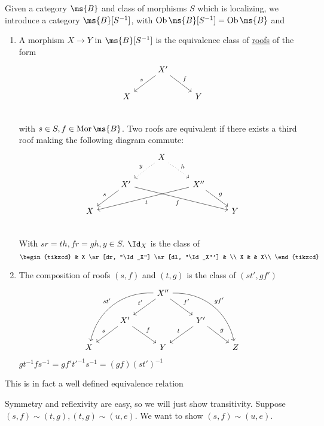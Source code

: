 \documentclass[x11names,reqno,14pt]{extarticle}
\DeclareMathOperator{\Ob}{Ob}
\DeclareMathOperator{\Mor}{Mor}
\begin{document}
Given a category $\ms{B}$ and class of morphisms $S$ which is localizing, we introduce a category $\ms{B}[S^{-1}]$, with $\Ob \ms{B}[S^{-1}] = \Ob\ms{B}$ and 
\begin{enumerate}[label=(\alph*)]

\item A morphism $X\to Y$ in $\ms{B}[S^{-1}]$ is the equivalence class of \underline{roofs} of the form 
\[
\begin{tikzcd}
& X' \ar[dl, "s"'] \ar[dr, "f"] & \\
X & & Y\\
\end{tikzcd}
\]
with $s \in S, f \in \Mor\ms{B}$. Two roofs are equivalent if there exists a third roof making the following diagram commute:
\[
\begin{tikzcd}
& & X\ar[dl, dotted, "y"'] \ar[dr, dotted, "h"] && \\
& X'\ar[dl, "s"']\ar[drrr,"f"'] && X''\ar[dlll, "t"] \ar[dr, "g"]& \\
X & && &Y \\
\end{tikzcd}
\]
With $sr = th, fr = gh, y \in S$. $\Id_X$ is the class of
\[
\begin{tikzcd}
& X \ar[dr, "\Id_X"] \ar[dl, "\Id_X"'] & \\
X & & X\\
\end{tikzcd}
\]

\item The composition of roofs $(s, f)$ and $(t, g)$ is the class of $(st', gf')$
\[
\begin{tikzcd}
& & X''\ar[dl, "t'"'] \ar[dr, "f'"] \ar[ddll, "st'"', bend right = 40]\ar[ddrr, "gf'", bend left = 40]& & \\
& X' \ar[dl, "s"'] \ar[dr, "f"]& & Y'\ar[dl, "t"'] \ar[dr, "g"] & \\
X& & Y& & Z
\end{tikzcd}
\]
$gt^{-1}fs^{-1} = gf't'^{-1}s^{-1} = (gf)(st')^{-1}$

\end{enumerate}

\thm

This is in fact a well defined equivalence relation

\proof

Symmetry and reflexivity are easy, so we will just show transitivity. Suppose $(s, f) \sim (t, g), (t, g) \sim (u, e)$. We want to show $(s, f) \sim (u, e)$. 
\end{document}
